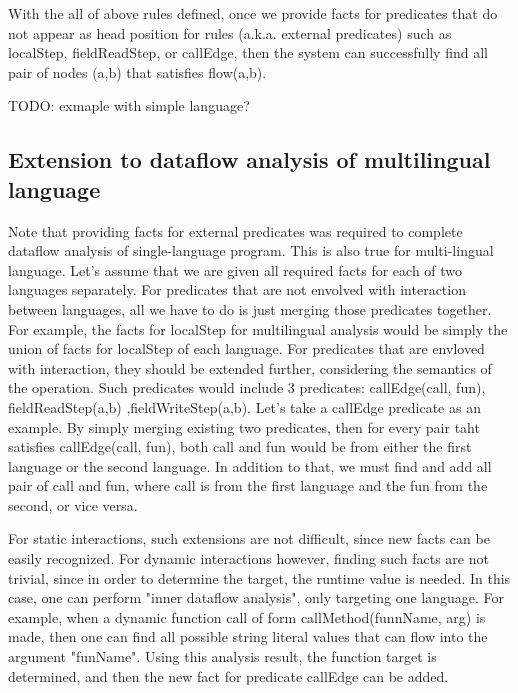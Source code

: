 With the all of above rules defined, once we provide facts for predicates that
do not appear as head position for rules (a.k.a. external predicates) such as localStep, fieldReadStep, or
callEdge, then the system can successfully find all pair of nodes (a,b) that
satisfies flow(a,b).

TODO: exmaple with simple language?

\subsection{Extension to dataflow analysis of multilingual language}

Note that providing facts for external predicates was required to complete
dataflow analysis of single-language program.  This is also true for
multi-lingual language. Let's assume that we are given all required facts for
each of two languages separately. For predicates that are not envolved with interaction
between languages, all we have to do is just merging those predicates together. For example,
the facts for localStep for multilingual analysis would be simply the union of facts for localStep
of each language. For predicates that are envloved with interaction, they should be extended further,
considering the semantics of the operation. Such predicates would include 3 predicates:
callEdge(call, fun), fieldReadStep(a,b) ,fieldWriteStep(a,b). Let's take a callEdge predicate as an
example. By simply merging existing two predicates, then for every pair taht satisfies callEdge(call, fun),
both call and fun would be from either the first language or the second language. In addition to that,
we must find and add all pair of call and fun, where call is from the first language and the fun from the second,
or vice versa.

For static interactions, such extensions are not difficult, since new facts can be easily recognized.
For dynamic interactions however, finding such facts are not trivial, since in order to determine the
target, the runtime value is needed. In this case, one can perform "inner dataflow analysis", only targeting
one language. For example, when a dynamic function call of form callMethod(funnName, arg) is made,
then one can find all possible string literal values that can flow into the argument "funName". Using this
analysis result, the function target is determined, and then the new fact for predicate callEdge can be added.
